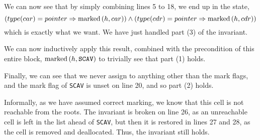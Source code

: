 \begin{lemma}
  We can now see that by simply combining lines 5 to 18, we end up in
  the state, \[(type(car) = pointer \Rightarrow \mathrm{marked}\left(h, car\right)) \land
  (type(cdr) = pointer \Rightarrow \mathrm{marked}\left(h, cdr\right))\] which is exactly
  what we want. We have just handled part (3) of the invariant.

  We can now inductively apply this result, combined with the
  precondition of this entire block, $\mathrm{marked}\left(h, \mathtt{SCAV}\right)$ to
  trivially see that part (1) holds.

  Finally, we can see that we never assign to anything other than the
  mark flags, and the mark flag of \texttt{SCAV} is unset on line 20,
  and so part (2) holds.
  \label{lem:lia}
\end{lemma}

\begin{lemma}
  Informally, as we have assumed correct marking, we know that this
  cell is not reachable from the roots. The invariant is broken on
  line 26, as an unreachable cell is left in the list ahead of
  \texttt{SCAV}, but then it is restored in lines 27 and 28, as the
  cell is removed and deallocated. Thus, the invariant still holds.
  \label{lem:lib}
\end{lemma}

